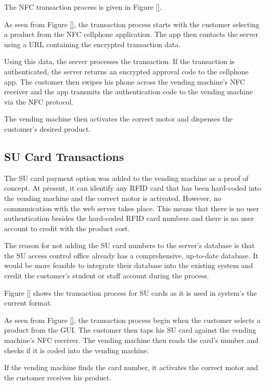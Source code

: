 
The NFC transaction process is given in Figure \ref{}.

As seen from Figure \ref{}, the transaction process starts with the customer
selecting a product from the NFC cellphone application. The app then contacts
the server using a URL containing the encrypted transaction data. 

Using this data, the server processes the transaction. If the transaction is
authenticated, the server returns an encrypted approval code to the cellphone
app. The customer then swipes his phone across the vending machine's NFC
receiver and the app transmits the authentication code to the vending machine
via the NFC protocol. 

The vending machine then activates the correct motor and dispenses the
customer's desired product.

\subsection{SU Card Transactions}
\label{sec:su-card}


The SU card payment option was added to the vending machine as a proof of
concept. At present, it can identify any RFID card that has been hard-coded
into the vending machine and the correct motor is activated. However, no
communication with the web server takes place. This means that there is no user
authentication besides the hard-coded RFID card numbers and there is no user
account to credit with the product cost.

The reason for not adding the SU card numbers to the server's database is that
the SU access control office already has a comprehensive, up-to-date database. It
would be more feasible to integrate their database into the existing system and
credit the customer's student or staff account during the process. 

Figure \ref{} shows the transaction process for SU cards as it is used in
system's the current format. 

As seen from Figure \ref{}, the transaction process begin when the customer
selects a product from the GUI. The customer then taps his SU card against the
vending machine's NFC receiver. The vending machine then reads the card's number
and checks if it is coded into the vending machine. 

If the vending machine finds the card number, it activates the correct motor and
the customer receives his product.
